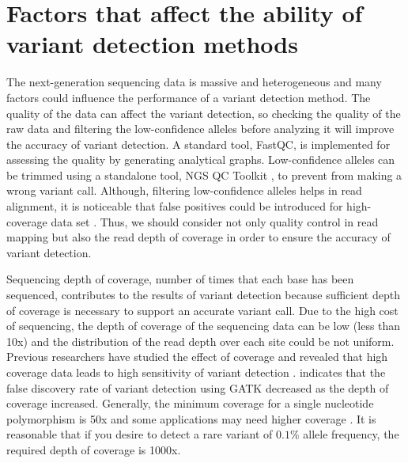 \documentclass[11pt,reqno]{amsart}
\begin{document}
\section{Factors that affect the ability of variant detection methods}
The next-generation sequencing data is massive and heterogeneous and many factors could influence the performance of a variant detection method.
The quality of the data can affect the variant detection, so checking the quality of the raw data and filtering the low-confidence alleles before analyzing it will improve the accuracy of variant detection.
A standard tool, FastQC, is implemented for assessing the quality by generating analytical graphs.
Low-confidence alleles can be trimmed using a standalone tool, NGS QC Toolkit \citep{patel2012ngs}, to prevent from making a wrong variant call.
Although, filtering low-confidence alleles helps in read alignment, it is noticeable that false positives could be introduced for high-coverage data set \citep{liu2012steps}.
Thus, we should consider not only quality control in read mapping but also the read depth of coverage in order to ensure the accuracy of variant detection.

Sequencing depth of coverage, number of times that each base has been sequenced, contributes to the results of variant detection because sufficient depth of coverage is necessary to support an accurate variant call.
Due to the high cost of sequencing, the depth of coverage of the sequencing data can be low (less than 10x) and the distribution of the read depth over each site could be not uniform.
Previous researchers have studied the effect of coverage and revealed that high coverage data leads to high sensitivity of variant detection \citep{neuman2013analysis, krawitz2010microindel}.
\citep{liu2013variant} indicates that the false discovery rate of variant detection using GATK decreased as the depth of coverage increased.
Generally, the minimum coverage for a single nucleotide polymorphism is 50x and some applications may need higher coverage \citep{Schlotterer2014}.
It is reasonable that if you desire to detect a rare variant of $0.1 \%$ allele frequency, the required depth of coverage is 1000x.
\end{document}
